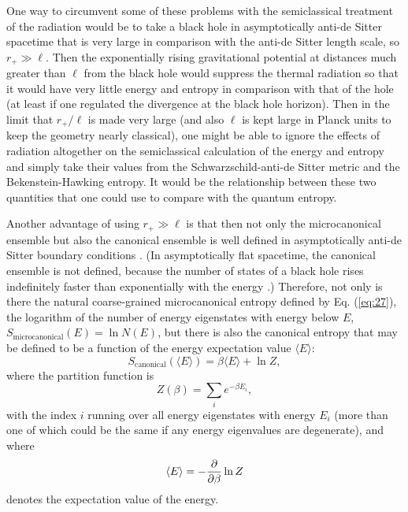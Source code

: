 \documentclass[12pt]{article} \usepackage{latexsym}
\begin{document}
One way to circumvent some of these problems with the semiclassical
treatment of the radiation would be to take a black hole in
asymptotically anti-de Sitter spacetime that is very large in
comparison with the anti-de Sitter length scale, so $r_+ \gg \ell$. 
Then the exponentially rising gravitational potential at distances much
greater than $\ell$ from the black hole would suppress the thermal
radiation so that it would have very little energy and entropy in
comparison with that of the hole (at least if one regulated the
divergence at the black hole horizon).  Then in the limit that
$r_+/\ell$ is made very large (and also $\ell$ is kept large in Planck
units to keep the geometry nearly classical), one might be able to
ignore the effects of radiation altogether on the semiclassical
calculation of the energy and entropy and simply take their values from
the Schwarzschild-anti-de Sitter metric and the Bekenstein-Hawking
entropy.  It would be the relationship between these two quantities
that one could use to compare with the quantum entropy.

Another advantage of using $r_+ \gg \ell$ is that then not only the
microcanonical ensemble but also the canonical ensemble is well defined
in asymptotically anti-de Sitter boundary conditions \cite{HawPage}. 
(In asymptotically flat spacetime, the canonical ensemble is not
defined, because the number of states of a black hole rises
indefinitely faster than exponentially with the energy \cite{Haw3}.) 
Therefore, not only is there the natural coarse-grained microcanonical
entropy defined by Eq. (\ref{eq:27}), the logarithm of the number of
energy eigenstates with energy below $E$,
$S_{\mathrm{microcanonical}}(E) = \ln{N(E)}$, but there is also the
canonical entropy that may be defined to be a function of the
energy expectation value $\langle E \rangle$:
 \begin{equation}
 S_{\mathrm{canonical}}(\langle E \rangle)
  = \beta \langle E \rangle + \ln{Z},
 \label{eq:30}
 \end{equation}
where the partition function is
 \begin{equation}
 Z(\beta) = \sum_i e^{-\beta E_i},
 \label{eq:31}
 \end{equation}
with the index $i$ running over all energy eigenstates with energy $E_i$
(more than one of which could be the same if any energy eigenvalues are
degenerate), and where
 \begin{equation}
 \langle E \rangle = - {\partial\over \partial\beta} \ln{Z}
 \label{eq:32}
 \end{equation}
denotes the expectation value of the energy.
\end{document}
